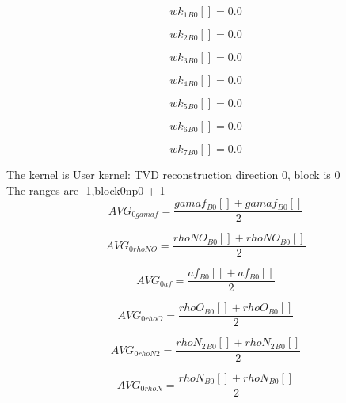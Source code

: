 \documentclass{article}
\begin{document}
\begin{dmath}{wk_{1}{_{B0}}}[{}] = 0.0\end{dmath}

\begin{dmath}{wk_{2}{_{B0}}}[{}] = 0.0\end{dmath}

\begin{dmath}{wk_{3}{_{B0}}}[{}] = 0.0\end{dmath}

\begin{dmath}{wk_{4}{_{B0}}}[{}] = 0.0\end{dmath}

\begin{dmath}{wk_{5}{_{B0}}}[{}] = 0.0\end{dmath}

\begin{dmath}{wk_{6}{_{B0}}}[{}] = 0.0\end{dmath}

\begin{dmath}{wk_{7}{_{B0}}}[{}] = 0.0\end{dmath}

\noindent The kernel is User kernel: TVD reconstruction direction 0, block is 0\\\noindent The ranges are -1,block0np0 + 1\\\begin{dmath}AVG_{0 gamaf} = \frac{{gamaf{_{B0}}}[{}] + {gamaf{_{B0}}}[{}]}{2}\end{dmath}

\begin{dmath}AVG_{0 rhoNO} = \frac{{rhoNO{_{B0}}}[{}] + {rhoNO{_{B0}}}[{}]}{2}\end{dmath}

\begin{dmath}AVG_{0 af} = \frac{{af{_{B0}}}[{}] + {af{_{B0}}}[{}]}{2}\end{dmath}

\begin{dmath}AVG_{0 rhoO} = \frac{{rhoO{_{B0}}}[{}] + {rhoO{_{B0}}}[{}]}{2}\end{dmath}

\begin{dmath}AVG_{0 rhoN2} = \frac{{rhoN_{2}{_{B0}}}[{}] + {rhoN_{2}{_{B0}}}[{}]}{2}\end{dmath}

\begin{dmath}AVG_{0 rhoN} = \frac{{rhoN{_{B0}}}[{}] + {rhoN{_{B0}}}[{}]}{2}\end{dmath}
\end{document}
